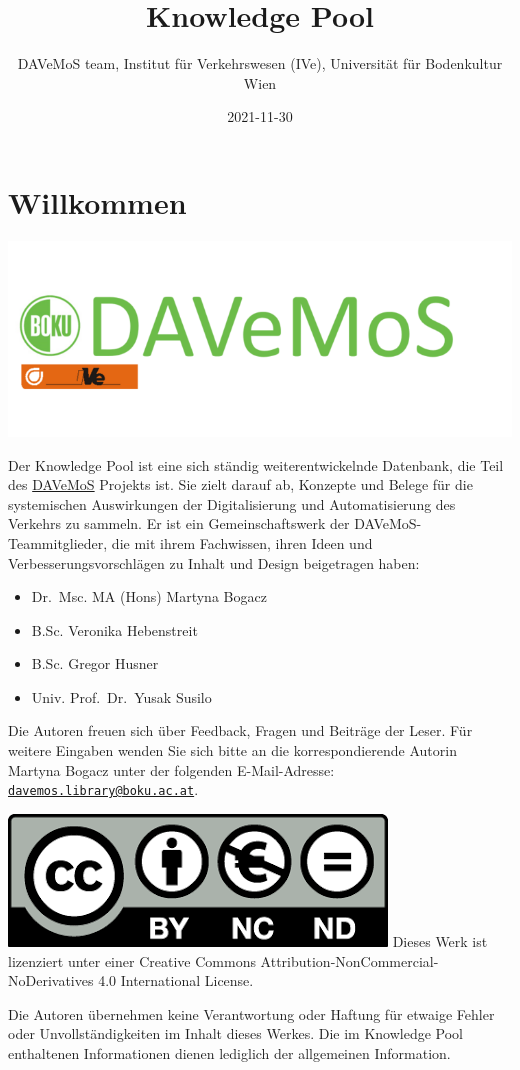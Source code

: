 \documentclass[
]{book}
\title{Knowledge Pool}
\author{DAVeMoS team, Institut für Verkehrswesen (IVe), Universität für Bodenkultur Wien}
\date{2021-11-30}
\providecommand{\tightlist}{%
  \setlength{\itemsep}{0pt}\setlength{\parskip}{0pt}}
\begin{document}
\maketitle

{
\setcounter{tocdepth}{1}
\tableofcontents
}
\hypertarget{willkommen}{%
\chapter*{Willkommen}\label{willkommen}}

\includegraphics[width=0.4\linewidth]{image/davemos_logo}

Der Knowledge Pool ist eine sich ständig weiterentwickelnde Datenbank, die Teil des \href{https://www.davemos.online/}{DAVeMoS} Projekts ist. Sie zielt darauf ab, Konzepte und Belege für die systemischen Auswirkungen der Digitalisierung und Automatisierung des Verkehrs zu sammeln. Er ist ein Gemeinschaftswerk der DAVeMoS-Teammitglieder, die mit ihrem Fachwissen, ihren Ideen und Verbesserungsvorschlägen zu Inhalt und Design beigetragen haben:

\begin{itemize}
\tightlist
\item
  Dr.~Msc. MA (Hons) Martyna Bogacz
\item
  B.Sc. Veronika Hebenstreit
\item
  B.Sc. Gregor Husner
\item
  Univ. Prof.~Dr.~Yusak Susilo
\end{itemize}

Die Autoren freuen sich über Feedback, Fragen und Beiträge der Leser. Für weitere Eingaben wenden Sie sich bitte an die korrespondierende Autorin Martyna Bogacz unter der folgenden E-Mail-Adresse: \href{mailto:davemos.library@boku.ac.at}{\nolinkurl{davemos.library@boku.ac.at}}.

\includegraphics[width=0.1\linewidth]{image/cc}
Dieses Werk ist lizenziert unter einer Creative Commons Attribution-NonCommercial-NoDerivatives 4.0 International License.

Die Autoren übernehmen keine Verantwortung oder Haftung für etwaige Fehler oder Unvollständigkeiten im Inhalt dieses Werkes. Die im Knowledge Pool enthaltenen Informationen dienen lediglich der allgemeinen Information.
\end{document}
